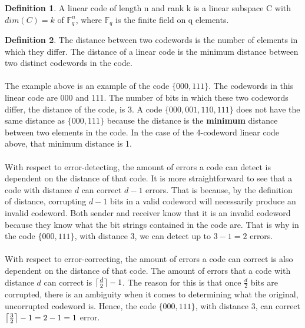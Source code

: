 \documentclass{article}
\DeclarePairedDelimiter{\ceil}{\lceil}{\rceil}
\theoremstyle{definition}
\newtheorem{definition}{Definition}[section]
\begin{document}
\begin{definition}
A linear code of length n and rank k is a linear subspace C with $dim(C)=k$ of $\mathbb{F}_{q}^{n}$, where $\mathbb{F}_{q}$ is the finite field on q elements. 
\end{definition}	

\begin{definition}
The distance between two codewords is the number of elements in which they differ.  The distance of a linear code is the minimum distance between two distinct codewords in the code.
\end{definition}

\paragraph{} The example above is an example of the code $\{000,111\}$.  The codewords in this linear code are 000 and 111.  The number of bits in which these two codewords differ, the distance of the code, is 3.  A code $\{000,001,110,111\}$ does not have the same distance as $\{000,111\}$ because the distance is the \textbf{minimum} distance between two elements in the code.  In the case of the 4-codeword linear code above, that minimum distance is 1.  

\paragraph{} With respect to error-detecting, the amount of errors a code can detect is dependent on the distance of that code.  It is more straightforward to see that a code with distance $d$ can correct $d-1$ errors.  That is because, by the definition of distance, corrupting $d-1$ bits in a valid codeword will necessarily produce an invalid codeword.  Both sender and receiver know that it is an invalid codeword because they know what the bit strings contained in the code are.  That is why in the code $\{000,111\}$, with distance 3, we can detect up to $3-1 = 2$ errors.  

\paragraph{} With respect to error-correcting, the amount of errors a code can correct is also dependent on the distance of that code.  The amount of errors that a code with distance $d$ can correct is $\ceil[\bigcap]{\frac{d}{2}} - 1$.  The reason for this is that once $\frac{d}{2}$ bits are corrupted, there is an ambiguity when it comes to determining what the original, uncorrupted codeword is.  Hence, the code $\{000,111\}$, with distance 3, can correct $\ceil[\big]{\frac{3}{2}}-1 = 2-1 = 1$ error.
\end{document}
